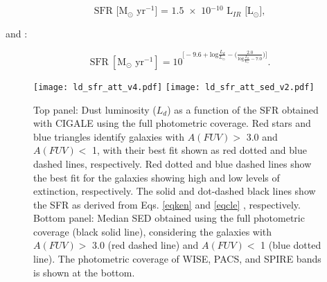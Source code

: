 \documentclass{aa}
\begin{document}
\begin{equation}
\textrm{SFR [M$_\odot$ yr$^{-1}$] = 1.5 $\times$ 10$^{-10}$ L$_{IR}$ [L$_\odot$]},
\label{eqken}
\end{equation}

and \citealt{cle}:

\begin{equation}
 \textrm{SFR} \ [\textrm{M$_\odot$ yr$^{-1}$}] = 10^{\Big[-9.6+\textrm{log}\frac{L_d}{L_\odot}-\Big(\frac{2.0}{\textrm{log}\frac{L_d}{L_\odot}-7.0}\Big)\Big]}.\label{eqcle}
\end{equation}

\begin{figure}\begin{center}
\texttt{[image: ld\_sfr\_att\_v4.pdf]}
\texttt{[image: ld\_sfr\_att\_sed\_v2.pdf]}
\end{center} 
\caption{Top panel: Dust luminosity ($L_d$) as a function of the SFR obtained with CIGALE \citep{nol} using the full photometric coverage. Red stars and blue triangles identify galaxies with $A(FUV) >$ 3.0 and $A(FUV) <$ 1, with their best fit shown as red dotted and blue dashed lines, respectively. Red dotted and blue dashed lines show the best fit for the galaxies showing high and low levels of extinction, respectively. The solid and dot-dashed black lines show the SFR as derived from Eqs. \ref{eqken} \citep{ken1} and \ref{eqcle} \citep{cle}, respectively. Bottom panel: Median SED obtained using the full photometric coverage (black solid line), considering the galaxies with $A(FUV) >$ 3.0 (red dashed line) and $A(FUV) <$ 1 (blue dotted line). The photometric coverage of WISE, PACS, and SPIRE bands is shown at the bottom.}\label{ldsfr}\end{figure}
\end{document}
